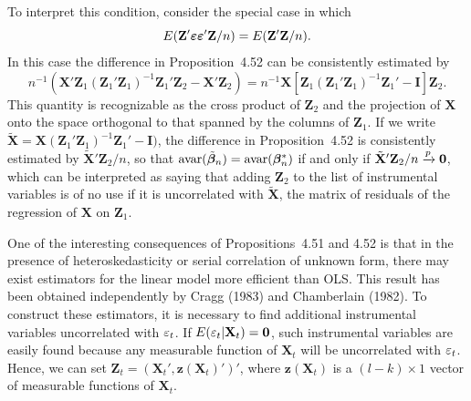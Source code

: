 To interpret this condition, consider the special case in which
\[
E(\mathbf{Z}'\boldsymbol{\varepsilon}\boldsymbol{\varepsilon}'\mathbf{Z}/n) = E(\mathbf{Z}'\mathbf{Z}/n).
\]
In this case the difference in Proposition~4.52 can be consistently estimated
by
\[
n^{-1}(\mathbf{X}'\mathbf{Z}_1(\mathbf{Z}_1'\mathbf{Z}_1)^{-1}\mathbf{Z}_1'\mathbf{Z}_2 - \mathbf{X}'\mathbf{Z}_2) = n^{-1}\mathbf{X}\left[\mathbf{Z}_1(\mathbf{Z}_1'\mathbf{Z}_1)^{-1}\mathbf{Z}_1' - \mathbf{I}\right]\mathbf{Z}_2.
\]
This quantity is recognizable as the cross product of $\mathbf{Z}_2$ and the projection
of $\mathbf{X}$ onto the space orthogonal to that spanned by the columns of $\mathbf{Z}_1$. If
we write $\tilde{\mathbf{X}} = \mathbf{X}(\mathbf{Z}_1'\mathbf{Z}_1)^{-1}\mathbf{Z}_1' - \mathbf{I})$, the difference in Proposition~4.52 is
consistently estimated by $\tilde{\mathbf{X}}'\mathbf{Z}_2/n$, so that $\mathrm{avar}(\tilde{\boldsymbol{\beta}}_n) = \mathrm{avar}(\boldsymbol{\beta}_n^*)$ if and only
if $\tilde{\mathbf{X}}'\mathbf{Z}_2/n \xrightarrow{p} \mathbf{0}$, which can be interpreted as saying that adding $\mathbf{Z}_2$ to the
list of instrumental variables is of no use if it is uncorrelated with $\tilde{\mathbf{X}}$, the
matrix of residuals of the regression of $\mathbf{X}$ on $\mathbf{Z}_1$.

One of the interesting consequences of Propositions~4.51 and 4.52 is that
in the presence of heteroskedasticity or serial correlation of unknown form,
there may exist estimators for the linear model more efficient than OLS.
This result has been obtained independently by Cragg (1983) and Chamberlain (1982). To construct these estimators, it is necessary to find additional instrumental variables uncorrelated with $\varepsilon_t$. If $E(\varepsilon_t|\mathbf{X}_t) = \mathbf{0}$, such
instrumental variables are easily found because any measurable function
of $\mathbf{X}_t$ will be uncorrelated with $\varepsilon_t$. Hence, we can set $\mathbf{Z}_t = (\mathbf{X}_t', \mathbf{z}(\mathbf{X}_t)')'$,
where $\mathbf{z}(\mathbf{X}_t)$ is a $(l - k) \times 1$ vector of measurable functions of $\mathbf{X}_t$.

